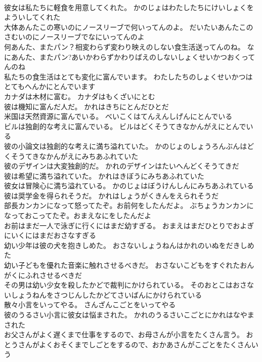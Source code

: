 \documentclass[8pt]{extreport}
\begin{document}
\begin{CJK}{UTF8}{min}
\\	彼女は私たちに軽食を用意してくれた。	かのじょはわたしたちにけいしょくをよういしてくれた 
\\	大体あんたこの寒いのにノースリーブで何いってんのよ。	だいたいあんたこのさむいのにノースリーブでなにいってんのよ 
\\	何あんた、またパン？相変わらず変わり映えのしない食生活送ってんのね。	なにあんた、またパン?あいかわらずかわりばえのしないしょくせいかつおくってんのね 
\\	私たちの食生活はとても変化に富んでいます。	わたしたちのしょくせいかつはとてもへんかにとんでいます 
\\	カナダは木材に富む。	カナダはもくざいにとむ 
\\	彼は機知に富んだ人だ。	かれはきちにとんだひとだ 
\\	米国は天然資源に富んでいる。	べいこくはてんえんしげんにとんでいる 
\\	ビルは独創的な考えに富んでいる。	ビルはどくそうてきなかんがえにとんでいる 
\\	彼の小論文は独創的な考えに満ち溢れていた。	かのじょのしょうろんぶんはどくそうてきなかんがえにみちあふれていた 
\\	彼のデザインは大変独創的だ。	かれのデザインはたいへんどくそうてきだ 
\\	彼は希望に満ち溢れていた。	かれはきぼうにみちあふれていた 
\\	彼女は冒険心に満ち溢れている。	かのじょはぼうけんしんにみちあふれている 
\\	彼は奨学金を得られそうだ。	かれはしょうがくきんをえられそうだ 
\\	部長カンカンになって怒ってたぞ。お前何をしたんだよ。	ぶちょうカンカンになっておこってたぞ。おまえなにをしたんだよ 
\\	お前はまだ一人で泳ぎに行くにはまだ幼すぎる。	おまえはまだひとりでおよぎにいくにはまだおさなすぎる 
\\	幼い少年は彼の犬を抱きしめた。	おさないしょうねんはかれのいぬをだきしめた 
\\	幼い子どもを優れた音楽に触れさせるべきだ。	おさないこどもをすぐれたおんがくにふれさせるべきだ 
\\	その男は幼い少女を殺したかどで裁判にかけられている。	そのおとこはおさないしょうねんをさつじんしたかどてさいばんにかけられている 
\\	散々小言をいってやる。	さんざんこごとをいってやる 
\\	彼のうるさい小言に彼女は悩まされた。	かれのうるさいこごとにかれはなやまされた 
\\	お父さんがよく遅くまで仕事をするので、お母さんが小言をたくさん言う。	おとうさんがよくおそくまでしごとをするので、おかあさんがこごとをたくさんいう 

\end{CJK}
\end{document}

